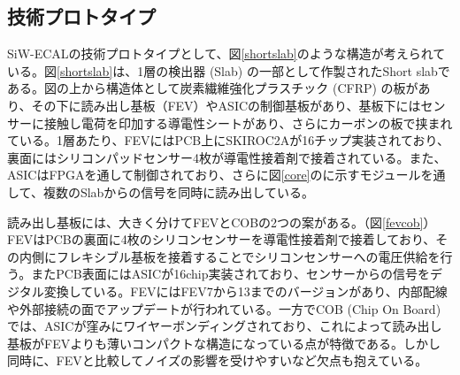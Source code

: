 \subsection{技術プロトタイプ}
SiW-ECALの技術プロトタイプとして、図\ref{shortslab}のような構造が考えられている。図\ref{shortslab}は、1層の検出器 (Slab) の一部として作製されたShort slabである。図の上から構造体として炭素繊維強化プラスチック (CFRP) の板があり、その下に読み出し基板（FEV）やASICの制御基板があり、基板下にはセンサーに接触し電荷を印加する導電性シートがあり、さらにカーボンの板で挟まれている。1層あたり、FEVにはPCB上にSKIROC2Aが16チップ実装されており、裏面にはシリコンパッドセンサー4枚が導電性接着剤で接着されている。また、ASICはFPGAを通して制御されており、さらに図\ref{core}のに示すモジュールを通して、複数のSlabからの信号を同時に読み出している。

読み出し基板には、大きく分けてFEVとCOBの2つの案がある。（図\ref{fevcob}）FEVはPCBの裏面に4枚のシリコンセンサーを導電性接着剤で接着しており、その内側にフレキシブル基板を接着することでシリコンセンサーへの電圧供給を行う。またPCB表面にはASICが16chip実装されており、センサーからの信号をデジタル変換している。FEVにはFEV7から13までのバージョンがあり、内部配線や外部接続の面でアップデートが行われている。一方でCOB (Chip On Board) では、ASICが窪みにワイヤーボンディングされており、これによって読み出し基板がFEVよりも薄いコンパクトな構造になっている点が特徴である。しかし同時に、FEVと比較してノイズの影響を受けやすいなど欠点も抱えている。


